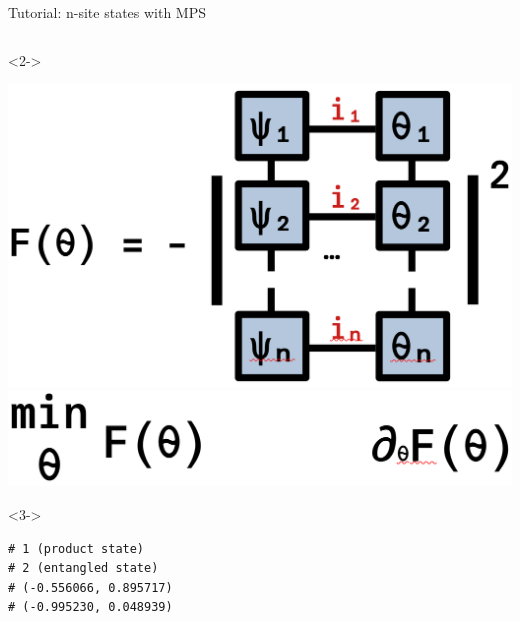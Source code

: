 \begin{frame}[fragile]{Tutorial: n-site states with MPS}
\begin{columns}
\begin{column}{4.5cm}
\begin{onlyenv}<2->
\vspace*{0.0cm}
\begin{center}
\includegraphics[width=\textwidth]{
  slides/assets/psin_thetan.png
} \\
\includegraphics[width=\textwidth]{
  slides/assets/min_grad_F_theta.png
}
\end{center}
\vspace*{0.0cm}
\end{onlyenv}

\begin{onlyenv}<3->

\begin{lstlisting}[style=julia, numbers=none, mathescape, basicstyle=\small]
# 1 (product state)
# 2 (entangled state)
# (-0.556066, 0.895717)
# (-0.995230, 0.048939)
\end{lstlisting}

\end{onlyenv}

\end{column}

\end{columns}

\end{frame}
